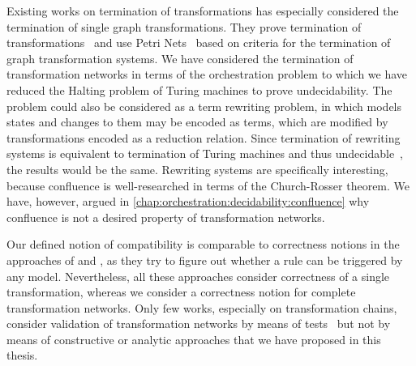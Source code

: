 Existing works on termination of transformations has especially considered the termination of single graph transformations.
They prove termination of transformations~\cite{ehrig2005termination-FASE} and use Petri Nets~\cite{varro2006termination-ICGT} based on criteria for the termination of graph transformation systems.
We have considered the termination of transformation networks in terms of the orchestration problem to which we have reduced the Halting problem of Turing machines to prove undecidability.
The problem could also be considered as a term rewriting problem, in which models states and changes to them may be encoded as terms, which are modified by transformations encoded as a reduction relation.
Since termination of rewriting systems is equivalent to termination of Turing machines and thus undecidable~\cite{endrullis2011undecidabilityRewriting-IC}, the results would be the same.
Rewriting systems are specifically interesting, because confluence is well-researched in terms of the Church-Rosser theorem.
We have, however, argued in \autoref{chap:orchestration:decidability:confluence} why confluence is not a desired property of transformation networks.

Our defined notion of compatibility is comparable to correctness notions in the approaches of \textcite{cuadrado2017tse} and \textcite{cabot2010VerificationInvariants-JSS}, as they try to figure out whether a rule can be triggered by any model.
Nevertheless, all these approaches consider correctness of a single transformation, whereas we consider a correctness notion for complete transformation networks.
Only few works, especially on transformation chains, consider validation of transformation networks by means of tests~\cite{bauer2011combiningCoverageChains-ICMT} but not by means of constructive or analytic approaches that we have proposed in this thesis.





